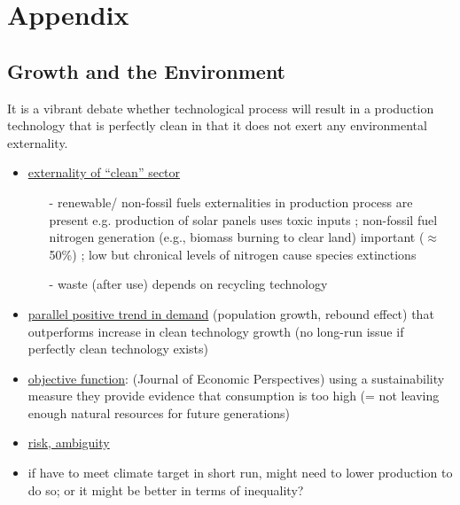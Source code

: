 \appendix
\section{Appendix}
\subsection{Growth and the Environment}
It is a vibrant debate whether technological process will result in a production technology that is perfectly clean in that it does not exert any environmental externality. 
\begin{itemize}
	\item \underline{externality of ``clean'' sector} \citep[see also][]{Dasgupta2021, Brock2005ChapterEmpirics}
	\begin{itemize}
		\item[-] renewable/ non-fossil fuels \ar externalities in production process are present e.g. production of solar panels uses toxic inputs \citep{Yue2014DomesticAnalysis}; non-fossil fuel nitrogen generation (e.g., biomass burning to clear land) important ($\approx$ 50\%) \citep{Song2021ImportantEmissions}; low but chronical levels of nitrogen cause species extinctions \citep{Clark2008LossGrasslands}
		\item[-] waste (after use) \ar depends on recycling technology %
		
	\end{itemize}
	\item \underline{parallel positive trend in demand} (population growth, rebound effect) that outperforms increase in clean technology growth \small{(no long-run issue if perfectly clean technology exists)}
	\item \normalsize{\underline{objective function}:} \cite{Arrow2004AreMuch}(Journal of Economic Perspectives) \ar using a sustainability measure they provide evidence that consumption is too high (= not leaving enough natural resources for future generations)
	\item \underline{risk, ambiguity}
	\item if have to meet climate target in short run, might need to lower production to do so; or it might be better in terms of inequality?
\end{itemize}

